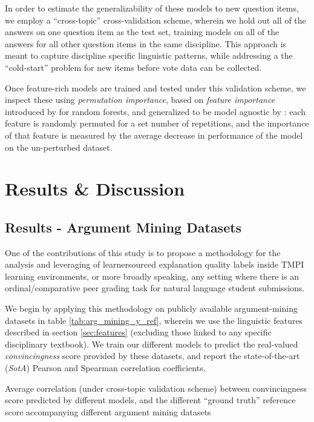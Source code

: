 \documentclass[notitlepage,12pt]{jedm}
\begin{document}
In order to estimate the generalizability of these models to new question 
items, we employ a ``cross-topic'' cross-validation scheme, wherein we hold out 
all of the answers on one question item as the test set, training models on all 
of the answers for all other question items in the same discipline.
This approach is meant to capture discipline specific linguistic patterns, 
while addressing a the ``cold-start'' problem for new items before vote data 
can be collected.

Once feature-rich models are trained and tested under this validation scheme, 
we inspect these using \textit{permutation importance}, based on 
\textit{feature importance} introduced by \cite{breiman_random_2001} for random 
forests, and generalized to be model agnostic by \cite{fisher_all_2019}: each 
feature is randomly permuted for a set number of repetitions, and the 
importance of that feature is measured by the average decrease in performance 
of the model on the un-perturbed dataset.



\section{Results \& Discussion}\label{sec:model_results}

\subsection{Results - Argument Mining Datasets}
One of the contributions of this study is to propose a methodology for the 
analysis and leveraging of learnersourced explanation quality labels inside 
TMPI learning environments, or more broadly speaking, any setting where there 
is an ordinal/comparative peer grading task for natural language student 
submissions.

We begin by applying this methodology on publicly available argument-mining 
datasets in table \ref{tab:arg_mining_y_ref}, wherein we use the linguistic 
features described in section \ref{sec:features} (excluding those linked to any 
specific disciplinary textbook).
We train our different models to predict the real-valued 
\textit{convincingness} score provided by these datasets, and report the 
state-of-the-art (\textit{SotA}) Pearson and Spearman correlation coefficients.

\begin{table}
	\parbox{.45\linewidth}{
		\centering
		
	}
	\hfill
	\parbox{.45\linewidth}{
		\centering
		
	}
\caption{Average correlation (under cross-topic validation scheme) between
	convincingness score predicted by different models, and the different 
	``ground truth'' reference score accompanying different argument mining 
	datasets}
\label{tab:arg_mining_y_ref}
\end{table}
\end{document}
